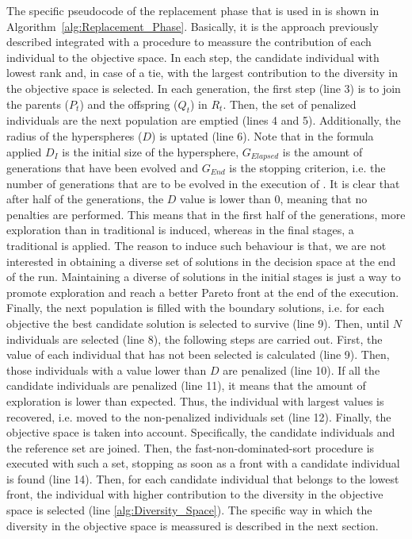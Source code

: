 The specific pseudocode of the replacement phase that is used in \VSDMOEA{} is shown in Algorithm~\ref{alg:Replacement_Phase}.
%
Basically, it is the approach previously described integrated with a procedure to meassure the contribution of each individual to the objective space.
%
In each step, the candidate individual with lowest rank and, in case of a tie, with the largest contribution to the diversity in the objective space is selected.
%
In each generation, the first step (line 3) is to join the parents ($P_t$) and the offspring ($Q_t$) in $R_t$.
%
Then, the set of penalized individuals are the next population are emptied (lines 4 and 5).
%
Additionally, the radius of the hyperspheres ($D$) is uptated (line 6).
%
Note that in the formula applied $D_I$ is the initial size of the hypersphere, $G_{Elapsed}$ is the amount of generations that have been evolved and $G_{End}$
is the stopping criterion, i.e. the number of generations that are to be evolved in the execution of \VSDMOEA{}.
%
It is clear that after half of the generations, the $D$ value is lower than 0, meaning that no penalties are performed.
%
This means that in the first half of the generations, more exploration than in traditional \MOEAS{} is induced, whereas 
in the final stages, a traditional \MOEA{} is applied.
%
The reason to induce such behaviour is that, we are not interested in obtaining a diverse set of solutions in the decision space at the end of the run.
%
Maintaining a diverse of solutions in the initial stages is just a way to promote exploration and reach a better Pareto front at the end of the execution.
%
Finally, the next population is filled with the boundary solutions, i.e. for each objective the best candidate solution is selected to survive (line 9).
%
Then, until $N$ individuals are selected (line 8), the following steps are carried out.
%
First, the \DCN{} value of each individual that has not been selected is calculated (line 9).
%
Then, those individuals with a \DCN{} value lower than $D$ are penalized (line 10).
%
If all the candidate individuals are penalized (line 11), it means that the amount of exploration is lower than expected.
%
Thus, the individual with largest \DCN{} values is recovered, i.e. moved to the non-penalized individuals set (line 12).
%
Finally, the objective space is taken into account.
%
Specifically, the candidate individuals and the reference set are joined.
%
Then, the fast-non-dominated-sort procedure is executed with such a set, stopping as soon as a front with a candidate individual is found (line 14).
%
Then, for each candidate individual that belongs to the lowest front, the individual with higher contribution to the diversity in the objective space is selected (line \ref{alg:Diversity_Space}).
%
The specific way in which the diversity in the objective space is meassured is described in the next section.
%
%
%


